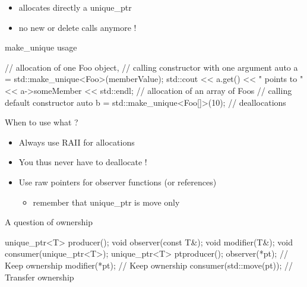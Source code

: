 \begin{frame}[fragile]
  \begin{block}{}
    \begin{itemize}
    \item allocates directly a unique\_ptr
    \item no new or delete calls anymore !
    \end{itemize}
  \end{block}
  \pause
  \begin{exampleblock}{make\_unique usage}
    \begin{cppcode*}{}
      // allocation of one Foo object,
      // calling constructor with one argument
      auto a = std::make_unique<Foo>(memberValue);
      std::cout << a.get() << " points to "
                << a->someMember << std::endl;
      // allocation of an array of Foos
      // calling default constructor
      auto b = std::make_unique<Foo[]>(10);
      // deallocations
    \end{cppcode*}
  \end{exampleblock}
\end{frame}

\begin{frame}[fragile]
  \begin{block}{When to use what ?}
    \begin{itemize}
    \item Always use RAII for allocations
    \item You thus never have to deallocate !
    \item Use raw pointers for observer functions (or references)
      \begin{itemize}
      \item remember that unique\_ptr is move only
      \end{itemize}
    \end{itemize}
  \end{block}
  \pause
  \begin{exampleblock}{A question of ownership}
    \begin{cppcode*}{}
      unique_ptr<T> producer();
      void observer(const T&);
      void modifier(T&);
      void consumer(unique_ptr<T>);
      unique_ptr<T> pt{producer()};
      observer(*pt);            // Keep ownership
      modifier(*pt);            // Keep ownership
      consumer(std::move(pt));  // Transfer ownership
    \end{cppcode*}
  \end{exampleblock}
\end{frame}

